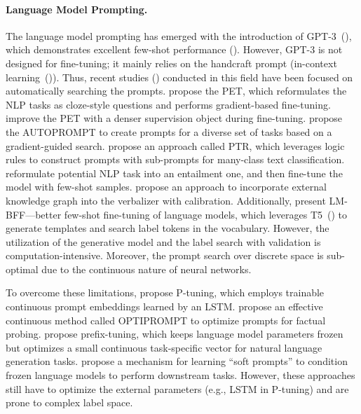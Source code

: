 \documentclass{article} \usepackage{iclr2022_conference,times}
\begin{document}
\paragraph{Language Model Prompting.} 
The language model prompting has emerged with the introduction of GPT-3~(\cite{DBLP:conf/nips/BrownMRSKDNSSAA20}), which demonstrates excellent few-shot performance (\cite{DBLP:journals/corr/abs-2107-13586}). 
However, GPT-3 is not designed for fine-tuning; it mainly relies on the handcraft prompt (in-context learning~(\cite{DBLP:journals/corr/abs-2101-06804,DBLP:journals/corr/abs-2102-09690,ding2021prompt,DBLP:journals/corr/abs-2108-04106})). 
Thus, recent studies (\cite{DBLP:journals/corr/abs-2104-06599,DBLP:journals/corr/abs-2101-00121,chen2021adaprompt}) conducted in this field have been focused on automatically searching the prompts. 
\cite{DBLP:conf/eacl/SchickS21,DBLP:journals/corr/abs-2009-07118} propose the PET, which reformulates the NLP tasks as cloze-style questions and performs gradient-based fine-tuning.
\cite{DBLP:journals/corr/abs-2103-11955} improve the PET with a denser supervision object during fine-tuning. 
\cite{DBLP:conf/emnlp/ShinRLWS20} propose the AUTOPROMPT to create prompts for a diverse set of tasks based on a gradient-guided search. 
\cite{DBLP:journals/corr/abs-2105-11259}  propose an approach called PTR, which leverages logic rules to construct prompts with sub-prompts for many-class text classification. 
\cite{DBLP:journals/corr/abs-2104-14690} reformulate potential NLP task into an entailment one, and then fine-tune the model with few-shot samples. 
\cite{DBLP:journals/corr/abs-2108-02035} propose an approach to incorporate external knowledge graph into the verbalizer with calibration. 
Additionally, \cite{DBLP:journals/corr/abs-2012-15723} present LM-BFF—better few-shot fine-tuning of language models, which leverages T5~(\cite{DBLP:journals/jmlr/RaffelSRLNMZLL20}) to generate templates and search label tokens in the vocabulary. 
However, the utilization of the generative model and the label search with validation is computation-intensive. 
Moreover, the prompt search over discrete space is sub-optimal due to the continuous nature of neural networks. 

To overcome these limitations,  \cite{DBLP:journals/corr/abs-2103-10385} propose P-tuning, which employs trainable continuous prompt embeddings learned by an LSTM. 
\cite{zhong2021factual} propose an effective continuous method called OPTIPROMPT to optimize prompts for factual probing. 
\cite{DBLP:journals/corr/abs-2103-10385} propose prefix-tuning, which keeps language model parameters frozen but optimizes a small continuous task-specific vector for natural language generation tasks.
\cite{DBLP:journals/corr/abs-2104-08691}  propose a mechanism for learning “soft prompts” to condition frozen language models to perform downstream tasks.
However, these approaches still have to optimize the external parameters (e.g., LSTM in P-tuning) and are prone to complex label space. 
\end{document}
